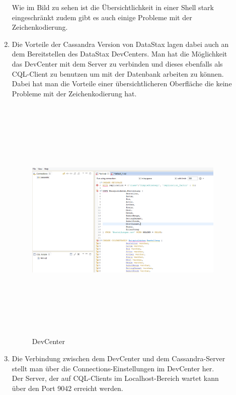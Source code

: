 \documentclass[a4paper, 12pt]{scrartcl}
\begin{document}
\begin{description}
\begin{enumerate}
      Wie im Bild zu sehen ist die Übersichtlichkeit in einer Shell stark eingeschränkt zudem gibt es auch einige Probleme mit der Zeichenkodierung. 
      \item Die Vorteile der Cassandra Version von DataStax lagen dabei auch an dem Bereitstellen des DataStax DevCenters. Man hat die Möglichkeit das DevCenter mit dem Server zu verbinden und dieses ebenfalls als CQL-Client zu benutzen um mit der Datenbank arbeiten zu können. Dabei hat man die Vorteile einer übersichtlicheren Oberfläche die keine Probleme mit der Zeichenkodierung hat. 

\begin{figure}[H]
\centering
\includegraphics[height=12cm, width=15cm, keepaspectratio]{cass6.png}
\caption{DevCenter}
\end{figure}    


      \item Die Verbindung zwischen dem DevCenter und dem Cassandra-Server stellt man über die Connections-Einstellungen im DevCenter her. \\ Der Server, der auf CQL-Clients im Localhost-Bereich wartet kann über den Port 9042 erreicht werden.


\end{enumerate}
\end{description}
\end{document}
